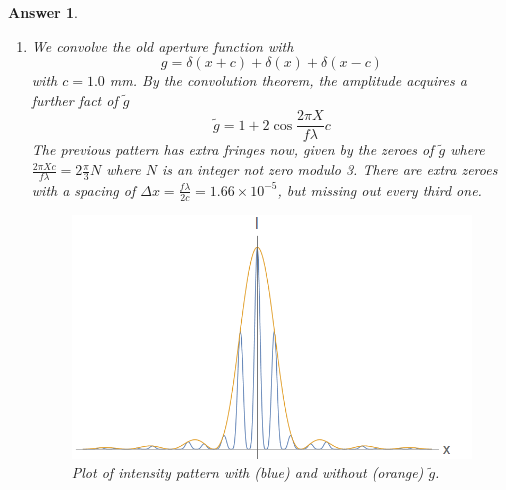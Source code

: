 \documentclass[a4paper]{article}
\DeclareMathOperator{\sinc}{sinc}
\newtheorem{ans}{Answer}[subsection]
\theoremstyle{new}
\begin{document}
\begin{ans}
\begin{enumerate}[label=(\roman*)]
\begin{figure}[H]
    \caption{Amplitude monochrome plot of $\sinc(5p)\sinc(2q)$ in $(p,q)$ plane. Positions of minima on the screen are at $(X,Y)=(m2.5\times10^{-4}, n1\times10^{-4})$.}
\end{figure}
\item We convolve the old aperture function with
$$g=\delta(x+c)+\delta(x)+\delta(x-c)$$
with $c=1.0$ mm. By the convolution theorem, the amplitude acquires a further fact of $\tilde{g}$
$$\tilde{g}=1+2\cos\frac{2\pi X}{f\lambda}c$$
The previous pattern has extra fringes now, given by the zeroes of $\tilde{g}$ where $\frac{2\pi Xc}{f\lambda}=2\frac{\pi}{3}N$ where $N$ is an integer not zero modulo 3. There are extra zeroes with a spacing of $\Delta x=\frac{f\lambda}{2c}=1.66\times10^{-5}$, but missing out every third one.
\begin{figure}[H]
    \centering
    \includegraphics[scale=0.5]{2016P2B8ii.PNG}
    \caption{Plot of intensity pattern with (blue) and without (orange) $\tilde{g}$.}
\end{figure}
\end{enumerate}
\end{ans}
\newpage
\end{document}
